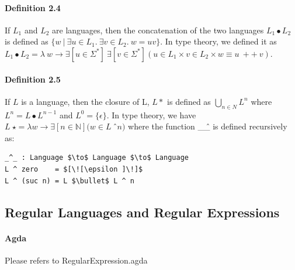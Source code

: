 \documentclass[twoside,openright,final]{bhamthesis}
\begin{document}
\paragraph{Definition 2.4} If \(L_1\) and \(L_2\) are languages, then
the concatenation of the two languages 
\(L_1\bullet L_2\) is defined
as \(\{w\  |\  \exists u\in L_1.\ \exists v\in L_2.\ w = uv\}\). In
type theory, we defined it as \(L_1\bullet L_2 = \lambda\ w \to \exists[
u \in \Sigma^* ]\ \exists[ v \in \Sigma^* ] ( u \in L_1 \times v \in L_2 \times w \equiv u\ ++\ v ) \).

\paragraph{Definition 2.5} If \(L\) is a language, then the closure of
L, \(L\ast\) is defined as \( \bigcup_{n \in N} L^n \) where
\( L^n = L\bullet L^{n - 1} \) and \(L^0 = \{\epsilon\}\). In type
theory, we have \(L\ \star = \lambda w \to \exists [ n \in \mathbb{N}
]( w \in L\ \)\^\ \(n)\) where the function \_\^ \_ is defined
recursively as: 
\begin{lstlisting}[mathescape=true,xleftmargin=.3\textwidth,aboveskip=0pt,belowskip=0pt]
_^_ : Language $\to$ Language $\to$ Language
L ^ zero    = $[\![\epsilon ]\!]$
L ^ (suc n) = L $\bullet$ L ^ n
\end{lstlisting}

\subsection{Regular Languages and Regular Expressions}
\paragraph{Agda} Please refers to RegularExpression.agda
\end{document}
